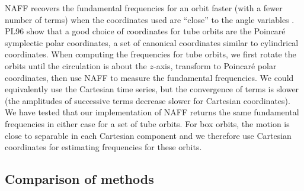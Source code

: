 \documentclass[letterpaper,12pt,preprint]{aastex}
\begin{document}

NAFF recovers the fundamental frequencies for an orbit faster (with a fewer number of terms) when the coordinates used are ``close'' to the angle variables \cite[PL96][]{papaphilippou96}. PL96 show that a good choice of coordinates for tube orbits are the Poincar\'e symplectic polar coordinates, a set of canonical coordinates similar to cylindrical coordinates. When computing the frequencies for tube orbits, we first rotate the orbits until the circulation is about the $z$-axis, transform to Poincar\'e polar coordinates, then use NAFF to measure the fundamental frequencies. We could equivalently use the Cartesian time series, but the convergence of terms is slower (the amplitudes of successive terms decrease slower for Cartesian coordinates). We have tested that our implementation of NAFF returns the same fundamental frequencies in either case for a set of tube orbits. For box orbits, the motion is close to separable in each Cartesian component and we therefore use Cartesian coordinates for estimating frequencies for these orbits.

\subsection{Comparison of methods}\label{sec:comparison}

\end{document}
